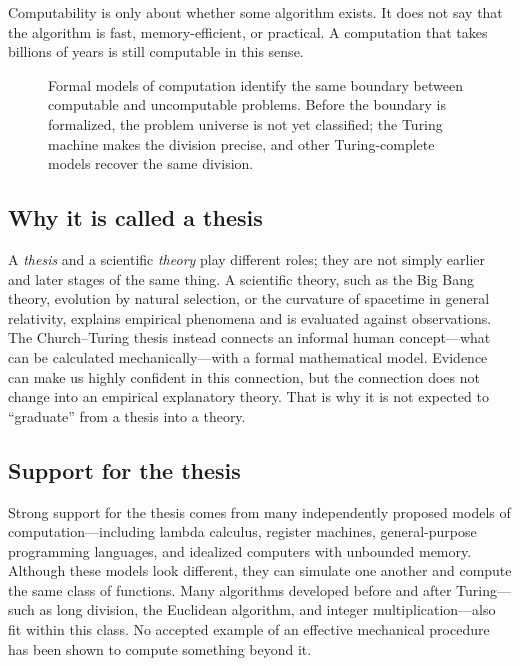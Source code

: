 \documentclass[11pt]{article}
\begin{document}
Computability is only about whether some algorithm exists. It does not say that
the algorithm is fast, memory-efficient, or practical. A computation that takes
billions of years is still computable in this sense.

\begin{figure}[htbp]
  \centering
  
  \caption{Formal models of computation identify the same boundary between
  computable and uncomputable problems. Before the boundary is formalized, the
  problem universe is not yet classified; the Turing machine makes the division
  precise, and other Turing-complete models recover the same division.}
  \label{fig:computability-boundary}
\end{figure}

\subsection{Why it is called a thesis}

A \emph{thesis} and a scientific \emph{theory} play different roles; they are
not simply earlier and later stages of the same thing. A scientific theory, such
as the Big Bang theory, evolution by natural selection, or the curvature of
spacetime in general relativity, explains empirical phenomena and is evaluated
against observations. The Church--Turing thesis instead connects an informal
human concept---what can be calculated mechanically---with a formal mathematical
model. Evidence can make us highly confident in this connection, but the
connection does not change into an empirical explanatory theory. That is why it
is not expected to ``graduate'' from a thesis into a theory.

\subsection{Support for the thesis}

Strong support for the thesis comes from many independently proposed models of
computation---including lambda calculus, register machines, general-purpose
programming languages, and idealized computers with unbounded memory. Although
these models look different, they can simulate one another and compute the same
class of functions. Many algorithms developed before and after Turing---such as
long division, the Euclidean algorithm, and integer multiplication---also fit
within this class. No accepted example of an effective mechanical procedure has
been shown to compute something beyond it.
\end{document}
